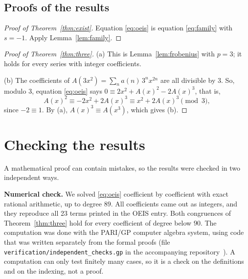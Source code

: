 \documentclass[11pt,a4paper]{article}
\theoremstyle{definition}
\theoremstyle{remark}
\newcommand{\para}[1]{\par\medskip\noindent\textbf{#1}\enspace}
\begin{document}
\subsection{Proofs of the results}

\begin{proof}[Proof of Theorem~\ref{thm:exist}]
Equation \eqref{eq:oeis} is equation \eqref{eq:family} with $s=-1$. Apply Lemma~\ref{lem:family}.
\end{proof}

\begin{proof}[Proof of Theorem~\ref{thm:three}]
(a) This is Lemma~\ref{lem:frobenius} with $p=3$; it holds for every series with integer coefficients.

(b) The coefficients of $A(3x^2)=\sum_na(n)\,3^nx^{2n}$ are all divisible by $3$. So, modulo $3$, equation
\eqref{eq:oeis} says $0\equiv2x^2+A(x)^2-2A(x)^3$, that is,
\[
A(x)^2\equiv-2x^2+2A(x)^3\equiv x^2+2A(x)^3\pmod 3 ,
\]
since $-2\equiv1$. By (a), $A(x)^3\equiv A(x^3)$, which gives (b).
\end{proof}

\section{Checking the results}\label{sec:checks}

A mathematical proof can contain mistakes, so the results were checked in two independent ways.

\para{Numerical check.}
We solved \eqref{eq:oeis} coefficient by coefficient with exact rational arithmetic, up to degree $89$. All
coefficients came out as integers, and they reproduce all 23 terms printed in the OEIS entry. Both congruences of
Theorem~\ref{thm:three} hold for every coefficient of degree below $90$.
The computation was done with the PARI/GP computer algebra system, using code that was written separately from the
formal proofs (file \texttt{verification/independent\_checks.gp} in the accompanying repository~\cite{repo}).
A computation can only test finitely many cases, so it is a check on the definitions and on the indexing, not a proof.
\end{document}
